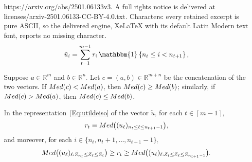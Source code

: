 \documentclass[10pt,a4paper]{amsart}
\newcommand{\One}[1]{{\mathbbm{1}}\left\{{#1}\right\}}
\newcommand{\R}{\mathbb{R}}
\begin{document}
https://arxiv.org/abs/2501.06133v3. A full rights notice is delivered at licenses/arxiv-2501.06133-CC-BY-4.0.txt. Characters: every retained excerpt is pure ASCII, so the delivered engine, XeLaTeX with its default Latin Modern text font, reports no missing character.
 \begin{equation}\label{Eq:utildeiso}
     \tilde{u}_i = \sum_{t=1}^{m-1}  r_i\,\One{n_t\leq i<n_{t+1}},
 \end{equation}

\begin{lemma}\label{lem:a-median-result}
Suppose $a\in\R^m$ and $b\in\R^n$. Let $c=(a,b)\in\R^{m+n}$ be the concatenation of the two vectors. If $\textnormal{Med}(c)< \textnormal{Med}(a)$, then $\textnormal{Med}(c)\geq\textnormal{Med}(b)$; similarly, if $\textnormal{Med}(c)>\textnormal{Med}(a)$, then $\textnormal{Med}(c)\leq\textnormal{Med}(b)$.
\end{lemma}

\begin{lemma}\label{lem:characterizing-isotonic-L1-projection_}
In the representation~\eqref{Eq:utildeiso} of the vector $\tilde{u}$, for each $t\in[m-1]$,     \begin{equation}\label{eq:cumulative-median-equals}
    r_t = \textnormal{Med}\bigl((u_\ell)_{n_t \leq \ell \leq n_{t+1}-1}\bigr) ,
    \end{equation}
    and moreover, for each $i \in \{n_t,n_t+1,\ldots,n_{t+1}-1\}$,
\begin{equation}\label{eq:cumulative-median-inequalities}
    \textnormal{Med}\bigl((u_\ell)_{\ell:Z_{n_t}\leq Z_\ell\leq Z_i}\bigr) 
        \geq r_t \geq  \textnormal{Med}\bigl((u_\ell)_{\ell:Z_i\leq Z_\ell\leq Z_{n_{t+1}-1}}\bigr).    
    \end{equation}
\end{lemma}
\end{document}
